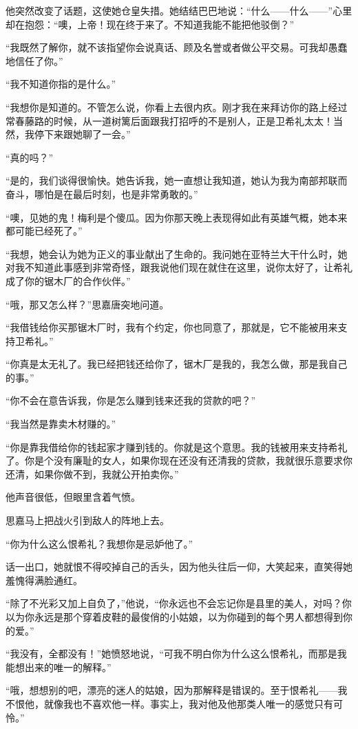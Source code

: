 \par 他突然改变了话题，这使她仓皇失措。她结结巴巴地说：“什么——什么——”心里却在抱怨：“噢，上帝！现在终于来了。不知道我能不能把他驳倒？”
\par “我既然了解你，就不该指望你会说真话、顾及名誉或者做公平交易。可我却愚蠢地信任了你。”
\par “我不知道你指的是什么。”
\par “我想你是知道的。不管怎么说，你看上去很内疚。刚才我在来拜访你的路上经过常春藤路的时候，从一道树篱后面跟我打招呼的不是别人，正是卫希礼太太！当然，我停下来跟她聊了一会。”
\par “真的吗？”
\par “是的，我们谈得很愉快。她告诉我，她一直想让我知道，她认为我为南部邦联而奋斗，哪怕是在最后时刻，也是非常勇敢的。”
\par “噢，见她的鬼！梅利是个傻瓜。因为你那天晚上表现得如此有英雄气概，她本来都可能已经死了。”
\par “我想，她会认为她为正义的事业献出了生命的。我问她在亚特兰大干什么时，她对我不知道此事感到非常奇怪，跟我说他们现在就住在这里，说你太好了，让希礼成了你的锯木厂的合作伙伴。”
\par “哦，那又怎么样？”思嘉唐突地问道。
\par “我借钱给你买那锯木厂时，我有个约定，你也同意了，那就是，它不能被用来支持卫希礼。”
\par “你真是太无礼了。我已经把钱还给你了，锯木厂是我的，我怎么做，那是我自己的事。”
\par “你不会在意告诉我，你是怎么赚到钱来还我的贷款的吧？”
\par “我当然是靠卖木材赚的。”
\par “你是靠我借给你的钱起家才赚到钱的。你就是这个意思。我的钱被用来支持希礼了。你是个没有廉耻的女人，如果你现在还没有还清我的贷款，我就很乐意要求你还清，如果你做不到，我就公开拍卖你。”
\par 他声音很低，但眼里含着气愤。
\par 思嘉马上把战火引到敌人的阵地上去。
\par “你为什么这么恨希礼？我想你是忌妒他了。”
\par 话一出口，她就恨不得咬掉自己的舌头，因为他头往后一仰，大笑起来，直笑得她羞愧得满脸通红。
\par “除了不光彩又加上自负了，”他说，“你永远也不会忘记你是县里的美人，对吗？你以为你永远是那个穿着皮鞋的最俊俏的小姑娘，以为你碰到的每个男人都想得到你的爱。”
\par “我没有，全都没有！”她愤怒地说，“可我不明白你为什么这么恨希礼，而那是我能想出来的唯一的解释。”
\par “哦，想想别的吧，漂亮的迷人的姑娘，因为那解释是错误的。至于恨希礼——我不恨他，就像我也不喜欢他一样。事实上，我对他及他那类人唯一的感觉只有可怜。”
